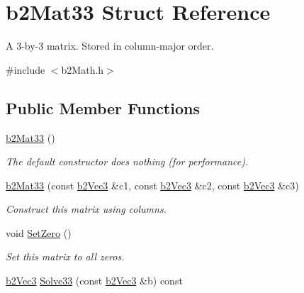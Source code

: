\hypertarget{structb2_mat33}{}\section{b2\+Mat33 Struct Reference}
\label{structb2_mat33}


A 3-\/by-\/3 matrix. Stored in column-\/major order.  




{\ttfamily \#include $<$b2\+Math.\+h$>$}

\subsection*{Public Member Functions}
\begin{DoxyCompactItemize}
\item 
\mbox{\label{structb2_mat33_a1f4d7ddf1c8a202fc08ec64dfe191463}} 
\hyperlink{structb2_mat33_a1f4d7ddf1c8a202fc08ec64dfe191463}{b2\+Mat33} ()
\begin{DoxyCompactList}\small\item\em The default constructor does nothing (for performance). \end{DoxyCompactList}\item 
\mbox{\label{structb2_mat33_a36d99a037008776c8d09fe0aeb5c759c}} 
\hyperlink{structb2_mat33_a36d99a037008776c8d09fe0aeb5c759c}{b2\+Mat33} (const \hyperlink{structb2_vec3}{b2\+Vec3} \&c1, const \hyperlink{structb2_vec3}{b2\+Vec3} \&c2, const \hyperlink{structb2_vec3}{b2\+Vec3} \&c3)
\begin{DoxyCompactList}\small\item\em Construct this matrix using columns. \end{DoxyCompactList}\item 
\mbox{\label{structb2_mat33_a42fc6953b025e1c8b59717d0ee7accde}} 
void \hyperlink{structb2_mat33_a42fc6953b025e1c8b59717d0ee7accde}{Set\+Zero} ()
\begin{DoxyCompactList}\small\item\em Set this matrix to all zeros. \end{DoxyCompactList}\item 
\hyperlink{structb2_vec3}{b2\+Vec3} \hyperlink{structb2_mat33_a2ce48f409ba5951a04da821dada9e285}{Solve33} (const \hyperlink{structb2_vec3}{b2\+Vec3} \&b) const
\item 

\end{DoxyCompactItemize}
